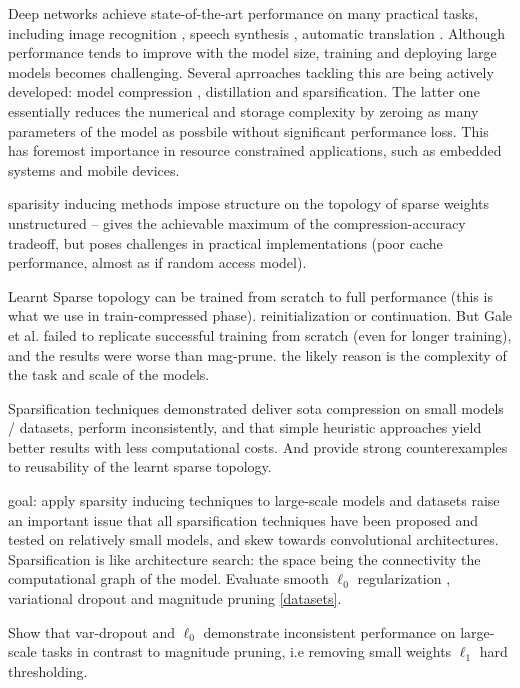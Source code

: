 Deep networks achieve state-of-the-art performance on many practical tasks, including
image recognition \citep{citation_needed}, speech synthesis \citep{citation_needed},
automatic translation \citep{citation_needed}. Although performance tends to improve
with the model size, training and deploying large models becomes challenging. Several
aprroaches tackling this are being actively developed: model compression \citep{pruning},
distillation \citep{distill} and sparsification. The latter one essentially reduces
the numerical and storage complexity by zeroing as many parameters of the model as
possbile without significant performance loss. This has foremost importance in resource
constrained applications, such as embedded systems and mobile devices.

sparisity inducing methods impose structure on the topology of sparse weights
unstructured -- gives the achievable maximum of the compression-accuracy tradeoff, but
poses challenges in practical implementations (poor cache performance, almost as if
random access model).

Learnt Sparse topology can be trained from scratch to full performance (this is what
we use in train-compressed phase). reinitialization or continuation. But Gale et al.
failed to replicate successful training from scratch (even for longer training), and
the results were worse than mag-prune. the likely reason is the complexity of the task
and scale of the models.

Sparsification techniques demonstrated deliver sota compression on small models / datasets,
perform inconsistently, and that simple heuristic approaches yield better results with less
computational costs. And provide strong counterexamples to reusability of the learnt sparse
topology.

goal: apply sparsity inducing techniques to large-scale models and datasets
\citet{galehooker} raise an important issue that all sparsification techniques have been
proposed and tested on relatively small models, and skew towards convolutional architectures.
Sparsification is like architecture search: the space being the connectivity the computational
graph of the model. Evaluate smooth $\ell_0$ regularization \citep{louizos}, variational
dropout \citep{kingma2015} and magnitude pruning \citep{zhu-gupta2017} \ref{datasets}.

Show that var-dropout and $\ell_0$ demonstrate inconsistent performance on large-scale tasks
in contrast to magnitude pruning, i.e removing small weights $\ell_1$ hard thresholding.

